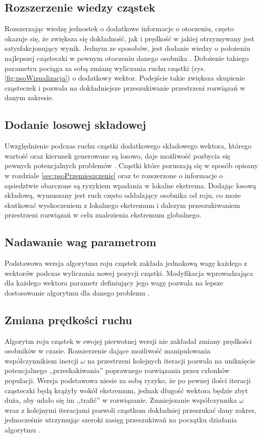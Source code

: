 \subsection{Rozszerzenie wiedzy cząstek}
\label{sec:psoSasiedztwo}
Rozszerzając wiedzę jednostek o dodatkowe informacje o otoczeniu, często okazuje się, że zwiększa się dokładność, jak i prędkość w jakiej otrzymywany jest satysfakcjonujący wynik. Jednym ze sposobów, jest dodanie wiedzy o położeniu najlepszej cząsteczki w pewnym otoczeniu danego osobnika \cite{PSOneighbourhood}. Dołożenie takiego parametru pociąga za sobą zmianę wyliczania ruchu cząstki (rys. \ref{fig:psoWizualizacja}) o dodatkowy wektor. Podejście takie zwiększa skupienie cząsteczek i pozwala na dokładniejsze przeszukiwanie przestrzeni rozwiązań w danym zakresie. 


\subsection{Dodanie losowej składowej}
\label{sec:psoLosowa}
Uwzględnienie podczas ruchu cząstki dodatkowego składowego wektora, którego wartość oraz kierunek generowane są losowo, daje możliwość pozbycia się pewnych potencjalnych problemów \cite{PSOrandom}. Cząstki które poruszają się w sposób opisany w rozdziale \ref{sec:psoPrzemieszczenie} oraz te rozszerzone o informacje o sąsiedztwie obarczone są ryzykiem wpadania w lokalne ekstrema. Dodając losową składową, wymuszany jest ruch często oddalający osobnika od roju, co może skutkować wyskoczeniem z lokalnego ekstremum i dalszym przeszukiwaniem przestrzeni rozwiązań w celu znalezienia ekstremum globalnego.


\subsection{Nadawanie wag parametrom}
\label{sec:psoWagi}
Podstawowa wersja algorytmu roju cząstek zakłada jednakową wagę każdego z wektorów podczas wyliczania nowej pozycji cząstki. Modyfikacja wprowadzająca dla każdego wektora parametr definiujący jego wagę pozwala na lepsze dostosowanie algorytmu dla danego problemu \cite{PSOparams}.


\subsection{Zmiana prędkości ruchu}
\label{sec:psoPredkosc}
Algorytm roju cząstek w swojej pierwotnej wersji nie zakładał zmiany prędkości osobników w czasie. Rozszerzenie dające możliwość manipulowania współczynnikiem inercji $\omega$ na przestrzeni kolejnych iteracji pozwala na uniknięcie potencjalnego ,,przeskakiwania'' poprawnego rozwiązania przez członków populacji. Wersja podstawowa niesie za sobą ryzyko, że po pewnej ilości iteracji cząsteczki będą krążyły wokół ekstremum, jednak długość wektora będzie zbyt duża, aby udało się im ,,trafić'' w rozwiązanie. Zmniejszanie współczynnika $\omega$ wraz z kolejnymi iteracjami pozwoli cząstkom dokładniej przeszukać dany zakres, jednocześnie utrzymując szeroki zasięg przeszukiwań na początku działania algorytmu \cite{PSOvelocity}.

